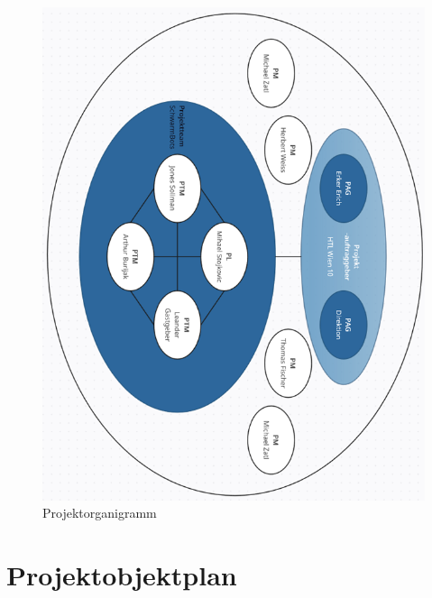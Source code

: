 \begin{figure}[H]
    \centering
    \includegraphics[width=\textwidth]{img/Projektorganigramm.png}
    \caption{Projektorganigramm}
    \label{fig:organigramm}
\end{figure}


\newpage

\section{Projektobjektplan}

